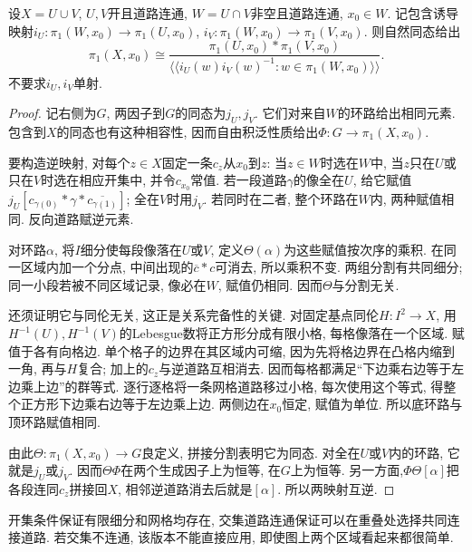 \begin{theorem}\label{thm:vankampen}
设$X=U\cup V$, $U,V$开且道路连通, $W=U\cap V$非空且道路连通, $x_0\in W$. 记包含诱导映射$i_U:\pi_1(W,x_0)\to\pi_1(U,x_0)$, $i_V:\pi_1(W,x_0)\to\pi_1(V,x_0)$. 则自然同态给出
\[
 \pi_1(X,x_0)\cong
 \frac{\pi_1(U,x_0)*\pi_1(V,x_0)}
 {\langle\!\langle i_U(w)i_V(w)^{-1}:w\in\pi_1(W,x_0)\rangle\!\rangle}.
\]
不要求$i_U,i_V$单射.
\end{theorem}
\begin{proof}
记右侧为$G$, 两因子到$G$的同态为$j_U,j_V$. 它们对来自$W$的环路给出相同元素. 包含到$X$的同态也有这种相容性, 因而自由积泛性质给出$\Phi:G\to\pi_1(X,x_0)$.

要构造逆映射, 对每个$z\in X$固定一条$c_z$从$x_0$到$z$: 当$z\in W$时选在$W$中, 当$z$只在$U$或只在$V$时选在相应开集中, 并令$c_{x_0}$常值. 若一段道路$\gamma$的像全在$U$, 给它赋值$j_U[c_{\gamma(0)}*\gamma*\overline{c_{\gamma(1)}}]$; 全在$V$时用$j_V$. 若同时在二者, 整个环路在$W$内, 两种赋值相同. 反向道路赋逆元素.

对环路$\alpha$, 将$I$细分使每段像落在$U$或$V$, 定义$\Theta(\alpha)$为这些赋值按次序的乘积. 在同一区域内加一个分点, 中间出现的$\overline c*c$可消去, 所以乘积不变. 两组分割有共同细分; 同一小段若被不同区域记录, 像必在$W$, 赋值仍相同. 因而$\Theta$与分割无关.

还须证明它与同伦无关, 这正是关系完备性的关键. 对固定基点同伦$H:I^2\to X$, 用$H^{-1}(U),H^{-1}(V)$的Lebesgue数将正方形分成有限小格, 每格像落在一个区域. 赋值于各有向格边. 单个格子的边界在其区域内可缩, 因为先将格边界在凸格内缩到一角, 再与$H$复合; 加上的$c_z$与逆道路互相消去. 因而每格都满足“下边乘右边等于左边乘上边”的群等式. 逐行逐格将一条网格道路移过小格, 每次使用这个等式, 得整个正方形下边乘右边等于左边乘上边. 两侧边在$x_0$恒定, 赋值为单位. 所以底环路与顶环路赋值相同.

由此$\Theta:\pi_1(X,x_0)\to G$良定义, 拼接分割表明它为同态. 对全在$U$或$V$内的环路, 它就是$j_U$或$j_V$. 因而$\Theta\Phi$在两个生成因子上为恒等, 在$G$上为恒等. 另一方面,$\Phi\Theta[\alpha]$把各段连同$c_z$拼接回$X$, 相邻逆道路消去后就是$[\alpha]$. 所以两映射互逆.
\end{proof}
开集条件保证有限细分和网格均存在, 交集道路连通保证可以在重叠处选择共同连接道路. 若交集不连通, 该版本不能直接应用, 即使图上两个区域看起来都很简单.

